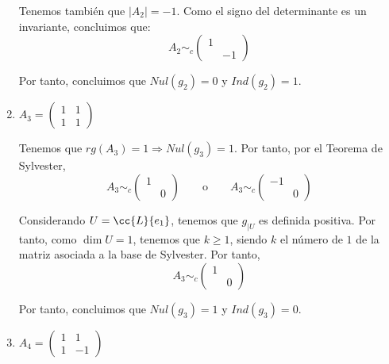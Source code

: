 \begin{ejercicio}
\begin{enumerate}
        Tenemos también que $|A_2| = -1$. Como el signo del determinante es un invariante, concluimos que:
        \begin{equation*}
            A_2 \sim_c \left(\begin{array}{cc}
                1 &  \\
                & -1
            \end{array} \right)
        \end{equation*}
        
        Por tanto, concluimos que $Nul(g_2)=0$ y $Ind(g_2)=1$.

        \item $A_3=\left(\begin{array}{cc}
            1 & 1 \\
            1 & 1
        \end{array} \right)$
        
        Tenemos que $rg(A_3) = 1 \Longrightarrow Nul(g_3)=1$. Por tanto, por el Teorema de Sylvester,
        \begin{equation*}
            A_3 \sim_c \left(\begin{array}{cc}
                1 &  \\
                & 0
            \end{array} \right)
            \qquad \text{o} \qquad
            A_3 \sim_c \left(\begin{array}{cc}
                -1 &  \\
                & 0
            \end{array} \right)
        \end{equation*}

        Considerando $U=\cc{L}\{e_1\}$, tenemos que $g_{\left|U \right.}$ es definida positiva. Por tanto, como $\dim U = 1$, tenemos que $k\geq 1$, siendo $k$ el número de $1$ de la matriz asociada a la base de Sylvester.
        Por tanto,
        \begin{equation*}
            A_3 \sim_c \left(\begin{array}{cc}
                1 &  \\
                & 0
            \end{array} \right)
        \end{equation*}
        
        Por tanto, concluimos que $Nul(g_3)=1$ y $Ind(g_3)=0$.

        \item $A_4=\left(\begin{array}{cc}
            1 & 1 \\
            1 & -1
        \end{array} \right)$
        

\end{enumerate}
\end{ejercicio}
